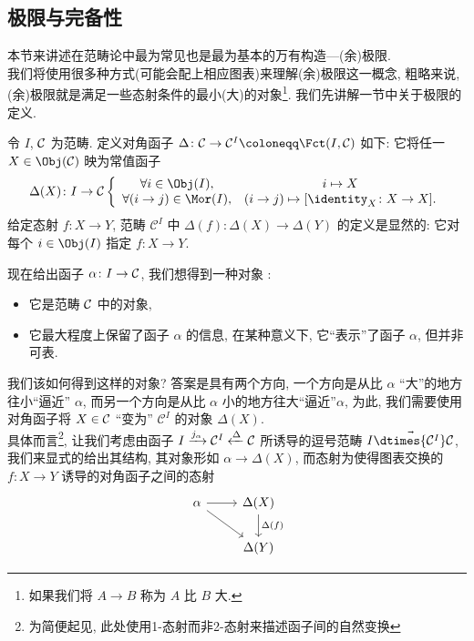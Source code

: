 \subsection{极限与完备性}
本节来讲述在范畴论中最为常见也是最为基本的万有构造---(余)极限.\\
我们将使用很多种方式(可能会配上相应图表)来理解(余)极限这一概念, 粗略来说, (余)极限就是满足一些态射条件的最小(大)的对象\footnote{如果我们将 $A \to B$ 称为 $A$ 比 $B$ 大.}. 我们先讲解\cite[$\S$ 2.7 极限]{李文威卷一}一节中关于极限的定义.
\begin{definition}
    令 $I$, $\cal{C}$ 为范畴. 定义对角函子 $\Delta \colon \mathcal{C} \to \mathcal{C}^I \coloneqq \Fct(I,\cal{C})$ 如下: 它将任一 $X \in \Obj(\cal{C})$ 映为常值函子
    \[
    \Delta(X) \colon I \to \mathcal{C} 
    \left\{
    \begin{array}{ccc}
        \forall i\in \Obj(I), &  i \mapsto X\\
         \forall (i\to j) \in \Mor(I),& (i\to j) \mapsto [\identity_X\colon X \to X]. 
    \end{array}
    \right.
    \]
    给定态射 $f \colon X \to Y$, 范畴 $\mathcal{C}^I$ 中 $\Delta(f) \colon \Delta(X) \to \Delta(Y)$ 的定义是显然的: 它对每个 $i\in \Obj(I)$ 指定 $f \colon X \to Y$.
\end{definition}
现在给出函子 $\alpha \colon I\to \cal{C}$, 我们想得到一种对象 : 
\begin{itemize}
    \item 它是范畴 $\cal{C}$ 中的对象,
    \item 它最大程度上保留了函子 $\alpha$ 的信息, 在某种意义下, 它``表示''了函子 $\alpha$, 但并非可表.
\end{itemize}
我们该如何得到这样的对象? 答案是具有两个方向, 一个方向是从比 $\alpha$ ``大''的地方往小``逼近'' $\alpha$, 而另一个方向是从比 $\alpha$ 小的地方往大``逼近''$\alpha$, 为此, 我们需要使用对角函子将 $X \in \cal{C}$ ``变为'' $\mathcal{C}^I$ 的对象 $\Delta(X)$. \\
具体而言\footnote{为简便起见, 此处使用1-态射而非2-态射来描述函子间的自然变换}, 让我们考虑由函子 $I \xrightarrow{j_{\alpha}} \mathcal{C}^I \xleftarrow{\Delta} \cal{C}$ 所诱导的逗号范畴 $I \vec{\dtimes{\mathcal{C}^I}}\cal{C}$, 我们来显式的给出其结构, 其对象形如 $\alpha \to \Delta(X)$, 而态射为使得图表交换的 $f \colon X \to Y$ 诱导的对角函子之间的态射
\[\begin{tikzcd}
	\alpha & {\Delta(X)} \\
	& {\Delta(Y)}
	\arrow[from=1-1, to=1-2]
	\arrow[from=1-1, to=2-2]
	\arrow["{\Delta(f)}", from=1-2, to=2-2]
\end{tikzcd}\]
